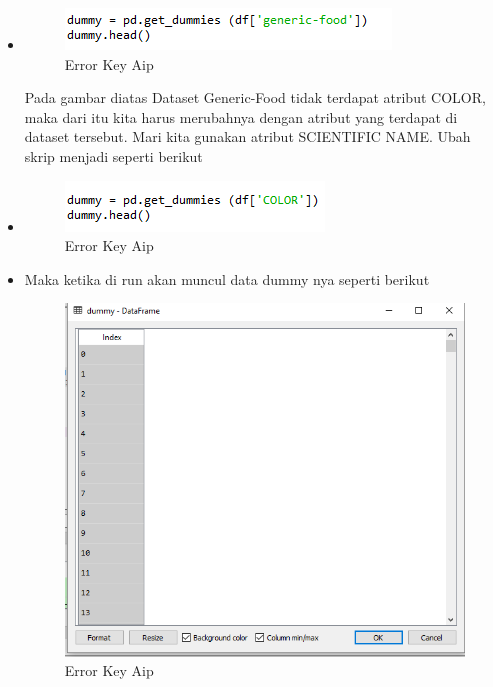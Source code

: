 \begin{itemize}
\item
\begin{figure}[ht]
\centering
\includegraphics[scale=0.5]{figures/AIP/errorc2.PNG}
\caption{Error Key Aip}
\label{Error}
\end{figure}
Pada gambar diatas Dataset Generic-Food tidak terdapat atribut COLOR, maka dari itu kita harus merubahnya dengan atribut yang terdapat di dataset tersebut. Mari kita gunakan atribut SCIENTIFIC NAME. Ubah skrip menjadi seperti berikut
\item
\begin{figure}[ht]
\centering
\includegraphics[scale=0.5]{figures/AIP/errorc3.PNG}
\caption{Error Key Aip}
\label{Error}
\end{figure}
\item Maka ketika di run akan muncul data dummy nya seperti berikut
\begin{figure}[ht]
\centering
\includegraphics[scale=0.5]{figures/AIP/errorc4.PNG}
\caption{Error Key Aip}
\label{Error}
\end{figure}
\end{itemize}




